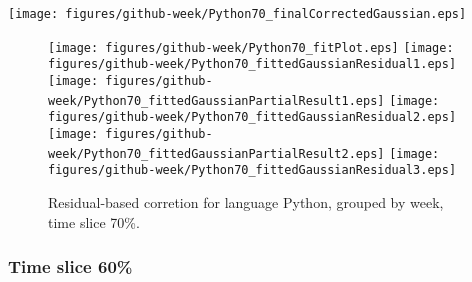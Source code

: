 \begin{center}
{\texttt{[image: figures/github-week/Python70\_finalCorrectedGaussian.eps]}}
\end{center}

\FloatBarrier

\begin{figure}[t]
\centering
{}
{\texttt{[image: figures/github-week/Python70\_fitPlot.eps]}}
{\texttt{[image: figures/github-week/Python70\_fittedGaussianResidual1.eps]}}
{\texttt{[image: figures/github-week/Python70\_fittedGaussianPartialResult1.eps]}}
{\texttt{[image: figures/github-week/Python70\_fittedGaussianResidual2.eps]}}
{\texttt{[image: figures/github-week/Python70\_fittedGaussianPartialResult2.eps]}}
{\texttt{[image: figures/github-week/Python70\_fittedGaussianResidual3.eps]}}
\caption{Residual-based corretion for language Python, grouped by week, time slice 70\%.}
\end{figure}


\FloatBarrier


\subsubsection{Time slice 60\%}

